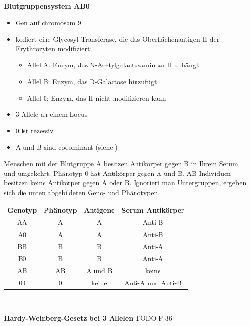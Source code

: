 \begin{bsp}
    \textbf{Blutgruppensystem AB0}
    \begin{itemize}
        \item Gen auf \gls{chromosom} 9
        \item kodiert eine Glycosyl-Transferase, die das
        Oberflächenantigen H der Erythrozyten modifiziert:
        \begin{itemize}
            \item Allel A: Enzym, das N-Acetylgalactosamin an H anhängt
            \item Allel B: Enzym, das D-Galactose hinzufügt
            \item Allel 0: Enzym, das H nicht modifizieren kann
        \end{itemize}
        \item 3 Allele an einem Locus
        \item 0 ist rezessiv
        \item A und B sind \gls{codominant} (siehe ) %
    \end{itemize}
    Menschen mit der Blutgruppe A besitzen Antikörper gegen B in
    Ihrem Serum und umgekehrt.
    Phänotyp 0 hat Antikörper gegen A und B\@.
    AB-Individuen besitzen keine Antikörper gegen A oder B\@.
    Ignoriert man Untergruppen, ergeben sich die unten abgebildeten Geno-
    und Phänotypen.
    \begin{mytable}
        \begin{tabular}{c|c|c|c}
            \textbf{Genotyp} & \textbf{Phänotyp} & \textbf{Antigene} & \textbf{Serum Antikörper} \\
            AA & A & A & Anti-B \\
            A0 & A & A & Anti-B \\
            BB & B & B & Anti-A \\
            B0 & B & B & Anti-A \\
            AB & AB & A und B & keine \\
            00 & 0 & keine & Anti-A und Anti-B \\
        \end{tabular}
    \end{mytable}~\cite{vorlesung10}
\end{bsp}

\begin{bsp}
    \textbf{Hardy-Weinberg-Gesetz bei 3 Allelen} TODO F 36
\end{bsp}

